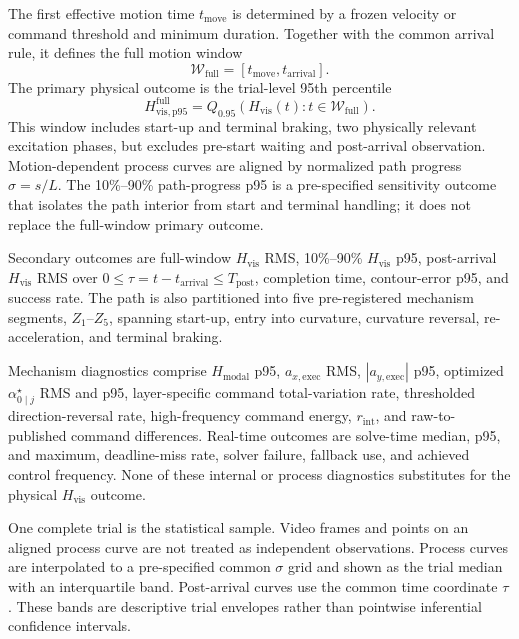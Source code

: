 The first effective motion time $t_{\mathrm{move}}$ is determined by a frozen
velocity or command threshold and minimum duration. Together with the common
arrival rule, it defines the full motion window
\begin{equation}
  \mathcal W_{\mathrm{full}}
  =[t_{\mathrm{move}},t_{\mathrm{arrival}}].
  \label{eq:full_motion_window}
\end{equation}
The primary physical outcome is the trial-level 95th percentile
\begin{equation}
  H_{\mathrm{vis,p95}}^{\mathrm{full}}
  =Q_{0.95}\!\left(
  H_{\mathrm{vis}}(t):t\in\mathcal W_{\mathrm{full}}
  \right).
  \label{eq:primary_rgb_outcome}
\end{equation}
This window includes start-up and terminal braking, two physically relevant
excitation phases, but excludes pre-start waiting and post-arrival observation.
Motion-dependent process curves are aligned by normalized path progress
$\sigma=s/L$. The 10\%--90\% path-progress p95 is a pre-specified sensitivity
outcome that isolates the path interior from start and terminal handling; it
does not replace the full-window primary outcome.

Secondary outcomes are full-window $H_{\mathrm{vis}}$ RMS, 10\%--90\%
$H_{\mathrm{vis}}$ p95, post-arrival $H_{\mathrm{vis}}$ RMS over
$0\leq\tau=t-t_{\mathrm{arrival}}\leq T_{\mathrm{post}}$, completion time,
contour-error p95, and success rate. The path is also partitioned into five
pre-registered mechanism segments, $Z_1$--$Z_5$, spanning start-up, entry into
curvature, curvature reversal, re-acceleration, and terminal braking.

Mechanism diagnostics comprise $H_{\mathrm{modal}}$ p95,
$a_{x,\mathrm{exec}}$ RMS, $|a_{y,\mathrm{exec}}|$ p95, optimized
$\alpha_{0\mid j}^{\star}$ RMS and p95, layer-specific command total-variation
rate, thresholded direction-reversal rate, high-frequency command energy,
$r_{\mathrm{int}}$, and raw-to-published command differences. Real-time
outcomes are solve-time median, p95, and maximum, deadline-miss rate, solver
failure, fallback use, and achieved control frequency. None of these internal
or process diagnostics substitutes for the physical $H_{\mathrm{vis}}$
outcome.

One complete trial is the statistical sample. Video frames and points on an
aligned process curve are not treated as independent observations. Process
curves are interpolated to a pre-specified common $\sigma$ grid and shown as
the trial median with an interquartile band. Post-arrival curves use the common
time coordinate $\tau$. These bands are descriptive trial envelopes rather
than pointwise inferential confidence intervals.

